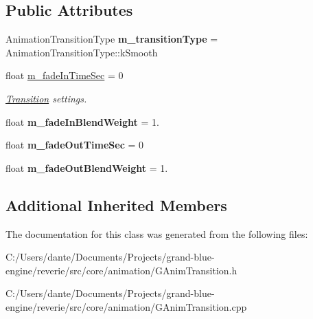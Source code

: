 \subsection*{Public Attributes}
\begin{DoxyCompactItemize}
\item 
\mbox{\label{classrev_1_1_transition_settings_a3a5bb8c7f771e1a96a15a4ecb6bc4fd6}} 
Animation\+Transition\+Type {\bfseries m\+\_\+transition\+Type} = Animation\+Transition\+Type\+::k\+Smooth
\item 
\mbox{\label{classrev_1_1_transition_settings_a161c24c4f54cf4e375eb0377ab509700}} 
float \mbox{\hyperlink{classrev_1_1_transition_settings_a161c24c4f54cf4e375eb0377ab509700}{m\+\_\+fade\+In\+Time\+Sec}} = 0
\begin{DoxyCompactList}\small\item\em \mbox{\hyperlink{struct_transition}{Transition}} settings. \end{DoxyCompactList}\item 
\mbox{\label{classrev_1_1_transition_settings_ac557874cf8e8d653d141dfa196f26369}} 
float {\bfseries m\+\_\+fade\+In\+Blend\+Weight} = 1.
\item 
\mbox{\label{classrev_1_1_transition_settings_ab2f4855ae81f451e97a5c6b5ee26e048}} 
float {\bfseries m\+\_\+fade\+Out\+Time\+Sec} = 0
\item 
\mbox{\label{classrev_1_1_transition_settings_afaa3436f6ef0fb5fc2771628073cdf60}} 
float {\bfseries m\+\_\+fade\+Out\+Blend\+Weight} = 1.
\end{DoxyCompactItemize}
\subsection*{Additional Inherited Members}


The documentation for this class was generated from the following files\+:\begin{DoxyCompactItemize}
\item 
C\+:/\+Users/dante/\+Documents/\+Projects/grand-\/blue-\/engine/reverie/src/core/animation/G\+Anim\+Transition.\+h\item 
C\+:/\+Users/dante/\+Documents/\+Projects/grand-\/blue-\/engine/reverie/src/core/animation/G\+Anim\+Transition.\+cpp\end{DoxyCompactItemize}
